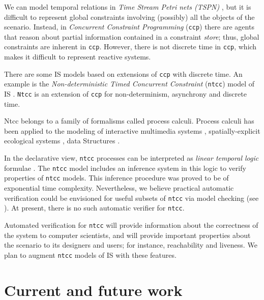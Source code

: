 \documentclass[]{lipics-iclp}
\theoremstyle{plain}\newtheorem{mainthm}[thm]{Main Theorem}
\theoremstyle{definition}\newtheorem{crucialdef}[thm]{Crucial Definition}
\begin{document}
We can model temporal relations in \textit{Time Stream Petri nets (TSPN)} \cite{SSW95}, but it is difficult to represent 
global constraints involving (possibly) all the objects of the scenario. Instead, in \textit{Concurrent Constraint Programming} (\texttt{ccp}) \cite{ccp} there are agents that reason about partial information contained in a constraint \textit{store}; thus,  global constraints are inherent in \texttt{ccp}. However, there is not discrete time in \texttt{ccp}, which makes it difficult to represent  reactive systems.


There are some IS models
based on extensions of \texttt{ccp} with discrete time. An example is the \textit{Non-deterministic Timed Concurrent Constraint} (\texttt{ntcc}) model of IS \cite{ntcc, AADR06}. \texttt{Ntcc} is an extension of \texttt{ccp} for non-determinism, asynchrony and discrete time. 

Ntcc belongs to a family of formalisms called process calculi. Process calculi has been applied to the modeling of interactive multimedia systems
 \cite{toro2016faust, toro2016gelisp, 2016arXiv160202169T, toro2015ntccrt, is-chapter,tdcr14,ntccrt,cc-chapter,torophd,torobsc,Toro-Bermudez10,Toro15,ArandaAOPRTV09,tdcc12,toro-report09,tdc10,tdcb10,tororeport},  spatially-explicit ecological systems \cite{EPTCS2047, PT13,TPSK14,PTA13,mean-field-techreport}, data Structures \cite{PAT2016, MorenoPT17, RestrepoPT17}.


In the declarative view, \texttt{ntcc} processes can be interpreted as \textit{linear temporal logic} formulae \cite{Pnu77}. The \texttt{ntcc} model includes an inference system in this logic to verify properties of  \texttt{ntcc} models. This inference procedure was proved to be of exponential time complexity. Nevertheless, we believe practical automatic verification could be envisioned  for useful subsets of \texttt{ntcc} via model checking (see \cite{fv06}). At present, there is no such automatic verifier for \texttt{ntcc}.



Automated verification for \texttt{ntcc} will provide information about the correctness of the system to computer scientists, and will provide important properties about the scenario to its designers and users; for instance, reachability and liveness. We plan to augment \texttt{ntcc} models of IS with these features.
\section{Current and future work}
\end{document}
